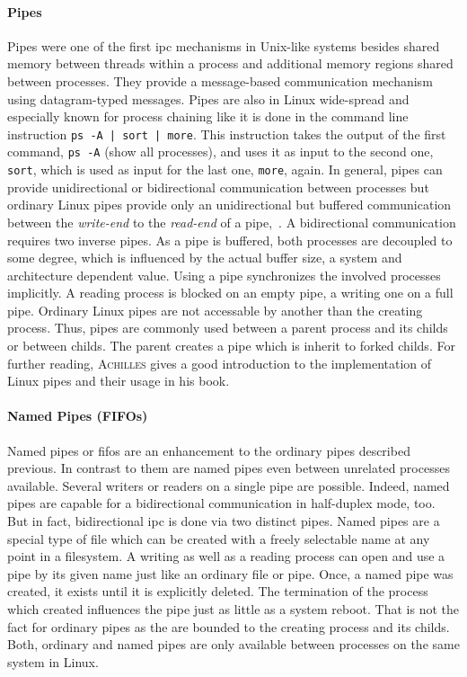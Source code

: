 \paragraph{Pipes}
Pipes were one of the first \ac{ipc} mechanisms in Unix-like systems besides shared memory between threads within a process and additional memory regions shared between processes.
They provide a message-based communication mechanism using datagram-typed messages.
Pipes are also in Linux wide-spread and especially known for process chaining like it is done in the command line instruction \texttt{ps -A | sort | more}.
This instruction takes the output of the first command, \texttt{ps -A} (show all processes), and uses it as input to the second one, \texttt{sort}, which is used as input for the last one, \texttt{more}, again.
In general, pipes can provide unidirectional or bidirectional communication between processes but ordinary Linux pipes provide only an unidirectional but buffered communication between the \textit{write-end} to the \textit{read-end} of a pipe\cite{glatz2015betriebssysteme},~\cite{silberschatz2009operating}.
A bidirectional communication requires two inverse pipes\cite{silberschatz2009operating}.
As a pipe is buffered, both processes are decoupled to some degree, which is influenced by the actual buffer size, a system and architecture dependent value.
Using a pipe synchronizes the involved processes implicitly.
A reading process is blocked on an empty pipe, a writing one on a full pipe\cite{glatz2015betriebssysteme}.
Ordinary Linux pipes are not accessable by another than the creating process.
Thus, pipes are commonly used between a parent process and its childs or between childs.
The parent creates a pipe which is inherit to forked childs\cite{silberschatz2009operating}.
For further reading, \textsc{Achilles} gives a good introduction to the implementation of Linux pipes and their usage in his book\cite{achilles2006betriebssysteme}. 

\paragraph{Named Pipes (FIFOs)}
Named pipes or \acp{fifo} are an enhancement to the ordinary pipes described previous.
In contrast to them are named pipes even between unrelated processes available.
Several writers or readers on a single pipe are possible.
Indeed, named pipes are capable for a bidirectional communication in half-duplex mode, too.
But in fact, bidirectional \ac{ipc} is done via two distinct pipes\cite{silberschatz2009operating}.
Named pipes are a special type of file which can be created with a freely selectable name at any point in a filesystem.
A writing as well as a reading process can open and use a pipe by its given name just like an ordinary file or pipe\cite{glatz2015betriebssysteme}.
Once, a named pipe was created, it exists until it is explicitly deleted. 
The termination of the process which created influences the pipe just as little as a system reboot\cite{silberschatz2009operating}.
That is not the fact for ordinary pipes as the are bounded to the creating process and its childs.
Both, ordinary and named pipes are only available between processes on the same system in Linux\cite{silberschatz2009operating}. 

